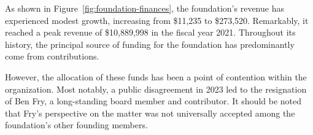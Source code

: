 As shown in Figure~\ref{fig:foundation-finances}, the foundation's revenue has experienced modest growth, increasing from \$11,235 to \$273,520. Remarkably, it reached a peak revenue of \$10,889,998 in the fiscal year 2021. Throughout its history, the principal source of funding for the foundation has predominantly come from contributions.

However, the allocation of these funds has been a point of contention within the organization. Most notably, a public disagreement in 2023 led to the resignation of Ben Fry, a long-standing board member and contributor. It should be noted that Fry's perspective on the matter was not universally accepted among the foundation's other founding members. \parencite{benfry[@ben_fry]HaveMadeExtremely2023} \parencite{caseyreas[@reas]EarlierThisWeek2023} \parencite{danielshiffman[@shiffman]WouldPostNote2023}

